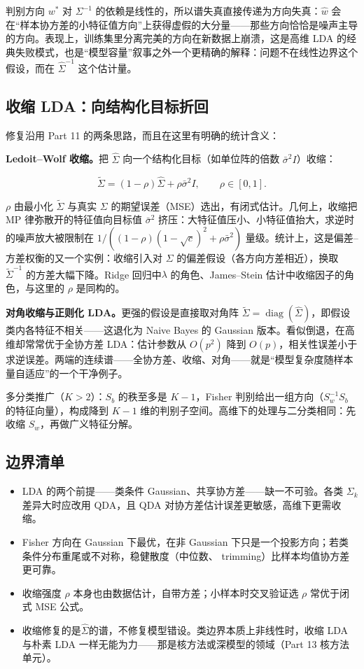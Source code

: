 判别方向 $w^\ast$ 对 $\Sigma^{-1}$ 的依赖是线性的，所以谱失真直接传递为方向失真：$\widehat w$ 会在``样本协方差的小特征值方向''上获得虚假的大分量——那些方向恰恰是噪声主导的方向。表现上，训练集里分离完美的方向在新数据上崩溃，这是高维 LDA 的经典失败模式，也是``模型容量''叙事之外一个更精确的解释：问题不在线性边界这个假设，而在 $\widehat\Sigma^{-1}$ 这个估计量。

\subsection{收缩 LDA：向结构化目标折回}

修复沿用 Part 11 的两条思路，而且在这里有明确的统计含义：

\textbf{Ledoit--Wolf 收缩。}把 $\widehat\Sigma$ 向一个结构化目标（如单位阵的倍数 $\bar\sigma^2 I$）收缩：

\[
\widetilde\Sigma=(1-\rho)\widehat\Sigma+\rho\bar\sigma^2 I,
\qquad \rho\in[0,1].
\]

$\rho$ 由最小化 $\widetilde\Sigma$ 与真实 $\Sigma$ 的期望误差（MSE）选出，有闭式估计。几何上，收缩把 MP 律弥散开的特征值向目标值 $\bar\sigma^2$ 挤压：大特征值压小、小特征值抬大，求逆时的噪声放大被限制在 $1/((1-\rho)(1-\sqrt c)^2+\rho\bar\sigma^2)$ 量级。统计上，这是偏差--方差权衡的又一个实例：收缩引入对 $\Sigma$ 的偏差假设（各方向方差相近），换取 $\widetilde\Sigma^{-1}$ 的方差大幅下降。Ridge 回归中$\lambda$ 的角色、James--Stein 估计中收缩因子的角色，与这里的 $\rho$ 是同构的。

\textbf{对角收缩与正则化 LDA。}更强的假设是直接取对角阵 $\widetilde\Sigma=\operatorname{diag}(\widehat\Sigma)$，即假设类内各特征不相关——这退化为 Naive Bayes 的 Gaussian 版本。看似倒退，在高维却常常优于全协方差 LDA：估计参数从 $O(p^2)$ 降到 $O(p)$，相关性误差小于求逆误差。两端的连续谱——全协方差、收缩、对角——就是``模型复杂度随样本量自适应''的一个干净例子。

多分类推广（$K>2$）：$S_b$ 的秩至多是 $K-1$，Fisher 判别给出一组方向（$S_w^{-1}S_b$ 的特征向量），构成降到 $K-1$ 维的判别子空间。高维下的处理与二分类相同：先收缩 $S_w$，再做广义特征分解。

\subsection{边界清单}

\begin{itemize}
\tightlist
\item
  LDA 的两个前提——类条件 Gaussian、共享协方差——缺一不可验。各类 $\Sigma_k$ 差异大时应改用 QDA，且 QDA 对协方差估计误差更敏感，高维下更需收缩。
\item
  Fisher 方向在 Gaussian 下最优，在非 Gaussian 下只是一个投影方向；若类条件分布重尾或不对称，稳健散度（中位数、 trimming）比样本均值协方差更可靠。
\item
  收缩强度 $\rho$ 本身也由数据估计，自带方差；小样本时交叉验证选 $\rho$ 常优于闭式 MSE 公式。
\item
  收缩修复的是$\widehat\Sigma$的谱，不修复模型错设。类边界本质上非线性时，收缩 LDA 与朴素 LDA 一样无能为力——那是核方法或深模型的领域（Part 13 核方法单元）。
\end{itemize}

